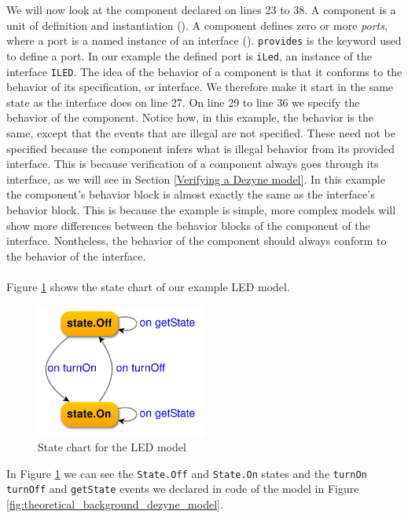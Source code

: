 \documentclass[12pt]{scrreprt}
\begin{document}
We will now look at the component declared on lines 23 to 38. A component is a unit of definition and instantiation (\cite{dzngloss}). A component defines zero or more \textit{ports}, where a port is a named instance of an interface (\cite{dzngloss}). \texttt{provides} is the keyword used to define a port. In our example the defined port is \texttt{iLed}, an instance of the interface \texttt{ILED}. The idea of the behavior of a component is that it conforms to the behavior of its specification, or interface. We therefore make it start in the same state as the interface does on line 27. On line 29 to line 36 we specify the behavior of the component. Notice how, in this example, the behavior is the same, except that the events that are illegal are not specified. These need not be specified because the component infers what is illegal behavior from its provided interface. This is because verification of a component always goes through its interface, as we will see in Section \ref{Verifying a Dezyne model}. In this example the component's behavior block is almost exactly the same as the interface's behavior block. This is because the example is simple, more complex models will show more differences between the behavior blocks of the component of the interface. Nontheless, the behavior of the component should always conform to the behavior of the interface.
\\\\
Figure \ref{fig:led_example_graph} shows the state chart of our example LED model.

\begin{figure}[H]
    \centering
    \includegraphics[width=0.5\textwidth]{Figures/theoretical_background/led_example_graph.png}
    \caption{State chart for the LED model}
    \label{fig:led_example_graph}
\end{figure}

In Figure \ref{fig:led_example_graph} we can see the \texttt{State.Off} and \texttt{State.On} states and  the \texttt{turnOn} \texttt{turnOff} and \texttt{getState} events we declared in code of the model in Figure \ref{fig:theoretical_background_dezyne_model}.
\end{document}
